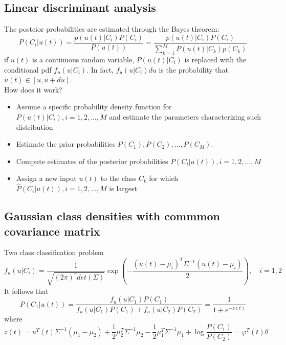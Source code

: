 \documentclass{book}
\begin{document}
\subsection{Linear discriminant analysis}
The posteior probabilities are estimated through the Bayes theorem:
\[
    P(C_i|u(t)) =\displaystyle\frac{p(u(t)|C_i)P(C_i)}{P(u(t))}=\displaystyle\frac{p(u(t)|C_i)P(C_i)}{\sum_{k=1}^{M}P(u(t)|C_k)p(C_k)}
\]
if $u(t)$ is a continuous random variable, $P(u(t)|C_i)$ is replaced with the conditional pdf $f_u(u|C_i)$. In fact, $f_u(u|C_i)du$ is the probability that $u(t)\in[u,u+du]$.
\\How does it work? 
\begin{itemize}
    \item Assume a specific probability density function for $P(u(t)|C_i),i=1,2,\dots,M$ and estimate the parameters characterizing such distribution 
    \item Estimate the prior probabilities $P(C_1),P(C_2),\dots,P(C_M)$. 
    \item Compute estimates of the posterior probabilities $P(C_i|u(t)),i=1,2,\dots,M$ 
    \item Assign a new input $u(t)$ to the class $C_k$ for which $\hat{P}(C_i|u(t)),i=1,2,\dots, M$ is largest
\end{itemize}

\subsection{Gaussian class densities with commmon covariance matrix}
Two class classification problem 
\[
    f_u(u|C_i)=\displaystyle\frac{1}{\sqrt{(2\pi)^rdet(\Sigma)}}\exp \left(-\displaystyle\frac{(u(t)-\mu_i)^T\Sigma^{-1}(u(t)-\mu_i)}{2}\right), \quad i=1,2
\]
It follows that 
\[
    P(C_1|u(t))=\displaystyle\frac{f_u(u|C_1)P(C_1)}{f_u(u|C_1)P(C_1)+f_u(u|C_2)P(C_2)}=\displaystyle\frac{1}{1+e^{-z(t)}}
\]
where
\[
    z(t)=u^T(t)\Sigma^{-1}(\mu_1-\mu_2)+\displaystyle\frac{1}{2}\mu_2^T\Sigma^{-1}\mu_2-\displaystyle\frac{1}{2}\mu_1^T\Sigma^{-1}\mu_1+\log\displaystyle\frac{P(C_1)}{P(C_2)}=\varphi^T(t)\theta
\]
\end{document}
